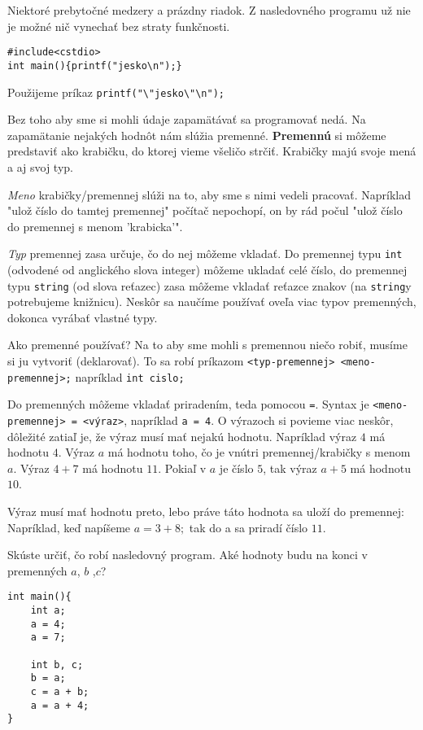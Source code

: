  Niektoré prebytočné medzery a prázdny riadok. Z nasledovného
programu už nie je možné nič vynechať bez straty funkčnosti.
\begin{lstlisting}
#include<cstdio>
int main(){printf("jesko\n");}
\end{lstlisting}

 Použijeme príkaz \verb!printf("\"jesko\"\n");!


Bez toho aby sme si mohli údaje zapamätávať sa programovať nedá. Na zapamätanie
nejakých hodnôt nám slúžia premenné. \textbf{Premennú} si môžeme predstaviť ako
krabičku, do ktorej vieme všeličo strčiť. Krabičky majú svoje mená a aj svoj
typ. 

\emph{Meno} krabičky/premennej slúži na to, aby sme s nimi vedeli pracovať.
Napríklad "ulož číslo do tamtej premennej" počítač nepochopí, on by rád počul
"ulož číslo do premennej s menom 'krabicka'". 

\emph{Typ} premennej zasa určuje, čo do nej môžeme vkladať. Do premennej typu
\verb!int! (odvodené od anglického slova integer) môžeme ukladať celé číslo, do
premennej typu \verb!string! (od slova reťazec) zasa môžeme vkladať reťazce
znakov (na \verb!string!y potrebujeme knižnicu). Neskôr sa naučíme používať
oveľa viac typov premenných, dokonca vyrábať vlastné typy.

\medskip

Ako premenné používať? Na to aby sme mohli s premennou niečo robiť, musíme si
ju vytvoriť (deklarovať). To sa robí príkazom \verb!<typ-premennej> <meno-premennej>;!
napríklad \verb!int cislo;! 

Do premenných môžeme vkladať priradením, teda pomocou \verb'='. Syntax je
\verb!<meno-premennej> = <výraz>!, napríklad \verb!a = 4!. O výrazoch si
povieme viac neskôr, dôležité zatiaľ je, že výraz musí mať nejakú hodnotu.
Napríklad výraz $4$ má hodnotu $4$. Výraz $a$ má hodnotu toho, čo je vnútri
premennej/krabičky s menom $a$.  Výraz $4 + 7$ má hodnotu $11$. Pokiaľ v $a$ je
číslo $5$, tak výraz $a + 5$ má hodnotu $10$.

Výraz musí mať hodnotu preto, lebo práve táto hodnota sa uloží do premennej:
Napríklad, keď napíšeme $a = 3 + 8;$ tak do a sa priradí číslo $11$.

 Skúste určiť, čo robí nasledovný program. Aké hodnoty budu na
konci v premenných $a$, $b$ ,$c$?
\begin{lstlisting}
int main(){
    int a;
    a = 4;
    a = 7;

    int b, c;
    b = a;
    c = a + b;
    a = a + 4;
}
\end{lstlisting}

